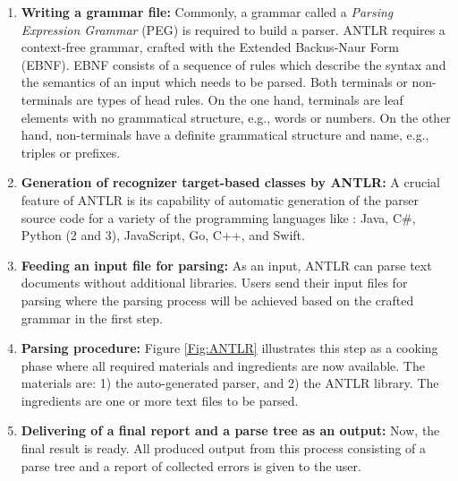 \begin{enumerate}
		\item  {\bf Writing a grammar file:} Commonly, a grammar called a \emph{Parsing Expression Grammar} (PEG) is required to build a parser. 
		ANTLR requires a context-free grammar, crafted with the Extended Backus-Naur Form (EBNF). 
		EBNF consists of a sequence of rules which describe the syntax and the semantics of an input which needs to be parsed. 
		Both terminals or non-terminals are types of head rules. 
		On the one hand, terminals are leaf elements with no grammatical structure, e.g., words or numbers. On the other hand, non-terminals have a definite grammatical structure and name, e.g., triples or prefixes. 

		\item {\bf Generation of recognizer target-based classes by ANTLR:} A crucial feature of ANTLR is its capability of automatic generation of the parser source code for a variety of the programming languages like \cite{ANTLR:Website:Online}: Java, C\#, Python (2 and 3), JavaScript, Go, C++, and Swift.
		
		\item {\bf Feeding an input file for parsing:} As an input, ANTLR can parse text documents without additional libraries. 
		Users send their input files for parsing where the parsing process will be achieved based on the crafted grammar in the first step.
		
		\item {\bf Parsing procedure:} {Figure \ref{Fig:ANTLR} } illustrates this step as a cooking phase where all required materials and ingredients are now available. 
		The materials are: 1) the auto-generated parser, and 2) the ANTLR library. 
		The ingredients are one or more text files to be parsed. 
		
		\item {\bf Delivering of a final report and a parse tree as an output:} Now, the final result is ready.
		All produced output from this process consisting of a parse tree and a report of collected errors is given to the user.
	\end{enumerate}











